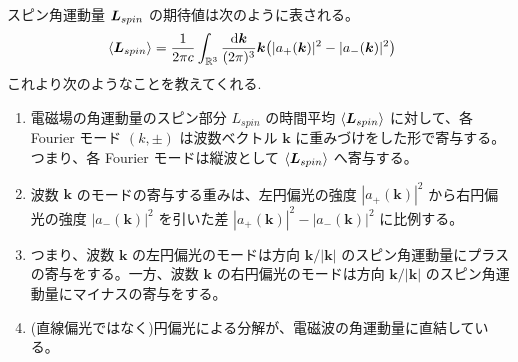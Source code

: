 \documentclass[uplatex,dvipdfmx,a4paper,11pt]{jlreq}
\newcommand{\RR}{\mathbb{R}}
\newcommand{\kk}{\bm{k}}
\theoremstyle{definition}
\begin{document}
\begin{theorem}
  スピン角運動量 $\bm{L}_{spin}$ の期待値は次のように表される。
  \begin{align}
    \langle\LL_{spin}\rangle & = \frac{1}{2\pi c}\int_{\RR^3}\frac{\dd{\kk}}{(2\pi)^3}\kk\qty(|a_+(\kk)|^2 - |a_-(\kk)|^2)
  \end{align}
  これより次のようなことを教えてくれる.
  \begin{enumerate}
    \item 電磁場の角運動量のスピン部分 $L_{spin}$ の時間平均 $\langle\bm{L}_{spin}\rangle$ に対して、各 Fourier モード $(k, \pm)$ は波数ベクトル $\kk$ に重みづけをした形で寄与する。つまり、各 Fourier モードは縦波として $\langle\bm{L}_{spin}\rangle$ へ寄与する。
    \item 波数 $\kk$ のモードの寄与する重みは、左円偏光の強度 $|a_+(\kk)|^2$ から右円偏光の強度 $|a_-(\kk)|^2$ を引いた差 $|a_+(\kk)|^2 - |a_-(\kk)|^2$ に比例する。
    \item つまり、波数 $\kk$ の左円偏光のモードは方向 $\kk/|\kk|$ のスピン角運動量にプラスの寄与をする。一方、波数 $\kk$ の右円偏光のモードは方向 $\kk/|\kk|$ のスピン角運動量にマイナスの寄与をする。
    \item (直線偏光ではなく)円偏光による分解が、電磁波の角運動量に直結している。
  \end{enumerate}
\end{theorem}
\end{document}
